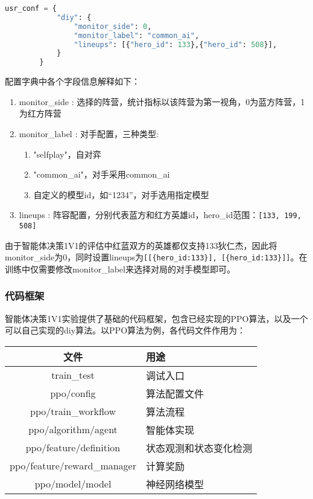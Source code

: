 \begin{lstlisting}[language=Python]
    usr_conf = {
            "diy": {
                "monitor_side": 0,
                "monitor_label": "common_ai",
                "lineups": [{"hero_id": 133},{"hero_id": 508}],
            }
        }
\end{lstlisting}

配置字典中各个字段信息解释如下：

\begin{enumerate}
    \item monitor\_side : 选择的阵营，统计指标以该阵营为第一视角，0为蓝方阵营，1为红方阵营
    \item  monitor\_label : 对手配置，三种类型:
          \begin{enumerate}
              \item "selfplay"，自对弈
              \item "common\_ai"，对手采用common\_ai
              \item 自定义的模型id，如“1234”，对手选用指定模型
          \end{enumerate}
    \item lineups : 阵容配置，分别代表蓝方和红方英雄id，hero\_id范围：\verb|[133, 199, 508]|
\end{enumerate}

由于智能体决策1V1的评估中红蓝双方的英雄都仅支持133狄仁杰，因此将monitor\_side为0，同时设置lineups为\verb|[[{hero_id:133}], [{hero_id:133}]]|。在训练中仅需要修改monitor\_label来选择对局的对手模型即可。

\subsubsection{代码框架}

智能体决策1V1实验提供了基础的代码框架，包含已经实现的PPO算法，以及一个可以自己实现的diy算法。以PPO算法为例，各代码文件作用为：
\begin{center}
    \begin{tabular}{|c|l|} \hline
        \bfseries 文件              & \bfseries 用途         \\ \hline
        train\_test                 & 调试入口               \\ \hline
        ppo/config                  & 算法配置文件           \\ \hline
        ppo/train\_workflow         & 算法流程               \\ \hline
        ppo/algorithm/agent         & 智能体实现             \\ \hline
        ppo/feature/definition      & 状态观测和状态变化检测 \\ \hline
        ppo/feature/reward\_manager & 计算奖励               \\ \hline
        ppo/model/model             & 神经网络模型           \\ \hline
    \end{tabular}
\end{center}

